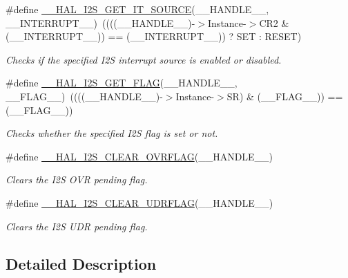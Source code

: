 \begin{DoxyCompactItemize}
\item 
\#define \hyperlink{group___i2_s___exported___macros_ga722512f6ff5e3bc5c6ef34ae2ab93f4e}{\+\_\+\+\_\+\+H\+A\+L\+\_\+\+I2\+S\+\_\+\+G\+E\+T\+\_\+\+I\+T\+\_\+\+S\+O\+U\+R\+CE}(\+\_\+\+\_\+\+H\+A\+N\+D\+L\+E\+\_\+\+\_\+,  \+\_\+\+\_\+\+I\+N\+T\+E\+R\+R\+U\+P\+T\+\_\+\+\_\+)~((((\+\_\+\+\_\+\+H\+A\+N\+D\+L\+E\+\_\+\+\_\+)-\/$>$Instance-\/$>$C\+R2 \& (\+\_\+\+\_\+\+I\+N\+T\+E\+R\+R\+U\+P\+T\+\_\+\+\_\+)) == (\+\_\+\+\_\+\+I\+N\+T\+E\+R\+R\+U\+P\+T\+\_\+\+\_\+)) ? S\+ET \+: R\+E\+S\+ET)
\begin{DoxyCompactList}\small\item\em Checks if the specified I2S interrupt source is enabled or disabled. \end{DoxyCompactList}\item 
\#define \hyperlink{group___i2_s___exported___macros_gab4dcaccc00ab76a11c23a49e973df009}{\+\_\+\+\_\+\+H\+A\+L\+\_\+\+I2\+S\+\_\+\+G\+E\+T\+\_\+\+F\+L\+AG}(\+\_\+\+\_\+\+H\+A\+N\+D\+L\+E\+\_\+\+\_\+,  \+\_\+\+\_\+\+F\+L\+A\+G\+\_\+\+\_\+)~((((\+\_\+\+\_\+\+H\+A\+N\+D\+L\+E\+\_\+\+\_\+)-\/$>$Instance-\/$>$SR) \& (\+\_\+\+\_\+\+F\+L\+A\+G\+\_\+\+\_\+)) == (\+\_\+\+\_\+\+F\+L\+A\+G\+\_\+\+\_\+))
\begin{DoxyCompactList}\small\item\em Checks whether the specified I2S flag is set or not. \end{DoxyCompactList}\item 
\#define \hyperlink{group___i2_s___exported___macros_gabe5bab581b9d997faeb0132672376444}{\+\_\+\+\_\+\+H\+A\+L\+\_\+\+I2\+S\+\_\+\+C\+L\+E\+A\+R\+\_\+\+O\+V\+R\+F\+L\+AG}(\+\_\+\+\_\+\+H\+A\+N\+D\+L\+E\+\_\+\+\_\+)
\begin{DoxyCompactList}\small\item\em Clears the I2S O\+VR pending flag. \end{DoxyCompactList}\item 
\#define \hyperlink{group___i2_s___exported___macros_gafc275594559c5c1e26c23f3246260937}{\+\_\+\+\_\+\+H\+A\+L\+\_\+\+I2\+S\+\_\+\+C\+L\+E\+A\+R\+\_\+\+U\+D\+R\+F\+L\+AG}(\+\_\+\+\_\+\+H\+A\+N\+D\+L\+E\+\_\+\+\_\+)
\begin{DoxyCompactList}\small\item\em Clears the I2S U\+DR pending flag. \end{DoxyCompactList}\end{DoxyCompactItemize}


\subsection{Detailed Description}


